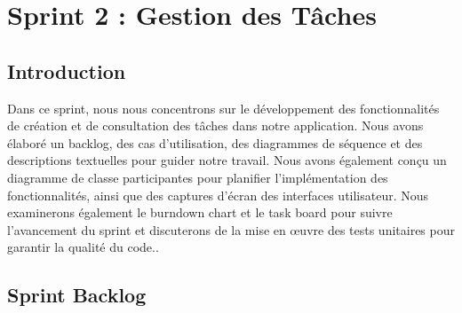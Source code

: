 
\chapter{  Sprint 2 : Gestion des Tâches }

\section*{Introduction}

Dans ce sprint, nous nous concentrons sur le développement des fonctionnalités de création et de consultation des tâches dans notre application. Nous avons élaboré un backlog, des cas d'utilisation, des diagrammes de séquence et des descriptions textuelles pour guider notre travail. Nous avons également conçu un diagramme de classe participantes pour planifier l'implémentation des fonctionnalités, ainsi que des captures d'écran des interfaces utilisateur. Nous examinerons également le burndown chart et le task board pour suivre l'avancement du sprint et discuterons de la mise en œuvre des tests unitaires pour garantir la qualité du code..

\section{Sprint Backlog}



